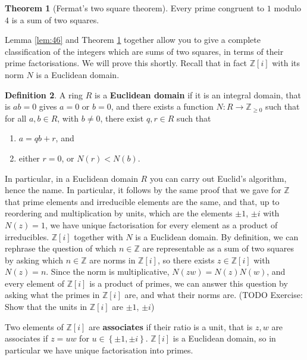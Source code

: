 \documentclass{article}
\newcommand{\Z}{\mathbb{Z}}
\newcommand{\rb}[1]{\left( #1 \right)}
\renewcommand{\sb}[1]{\left[ #1 \right]}
\newcommand{\cb}[1]{\left\{ #1 \right\}}
\theoremstyle{definition}\newtheorem{definition}{Definition}
\theoremstyle{definition}\newtheorem{remark}[definition]{Remark}
\theoremstyle{definition}\newtheorem*{example}{Example}
\theoremstyle{definition}\newtheorem*{note}{Note}
\newtheorem{theorem}[definition]{Theorem}
\begin{document}
\begin{theorem}[Fermat's two square theorem]
\label{thm:47}
Every prime congruent to $ 1 $ modulo $ 4 $ is a sum of two squares.
\end{theorem}

Lemma \ref{lem:46} and Theorem \ref{thm:47} together allow you to give a complete classification of the integers which are sums of two squares, in terms of their prime factorisations. We will prove this shortly. Recall that in fact $ \Z\sb{i} $ with its norm $ N $ is a Euclidean domain.

\begin{definition}
A ring $ R $ is a \textbf{Euclidean domain} if it is an integral domain, that is $ ab = 0 $ gives $ a = 0 $ or $ b = 0 $, and there exists a function $ N : R \to \Z_{\ge 0} $ such that for all $ a, b \in R $, with $ b \ne 0 $, there exist $ q, r \in R $ such that
\begin{enumerate}
\item $ a = qb + r $, and
\item either $ r = 0 $, or $ N\rb{r} < N\rb{b} $.
\end{enumerate}
\end{definition}

In particular, in a Euclidean domain $ R $ you can carry out Euclid's algorithm, hence the name. In particular, it follows by the same proof that we gave for $ \Z $ that prime elements and irreducible elements are the same, and that, up to reordering and multiplication by units, which are the elements $ \pm 1 $, $ \pm i $ with $ N\rb{z} = 1 $, we have unique factorisation for every element as a product of irreducibles. $ \Z\sb{i} $ together with $ N $ is a Euclidean domain. By definition, we can rephrase the question of which $ n \in \Z $ are representable as a sum of two squares by asking which $ n \in \Z $ are norms in $ \Z\sb{i} $, so there exists $ z \in \Z\sb{i} $ with $ N\rb{z} = n $. Since the norm is multiplicative, $ N\rb{zw} = N\rb{z}N\rb{w} $, and every element of $ \Z\sb{i} $ is a product of primes, we can answer this question by asking what the primes in $ \Z\sb{i} $ are, and what their norms are. (TODO Exercise: Show that the units in $ \Z\sb{i} $ are $ \pm 1 $, $ \pm i $)


Two elements of $ \Z\sb{i} $ are \textbf{associates} if their ratio is a unit, that is $ z, w $ are associates if $ z = uw $ for $ u \in \cb{\pm 1, \pm i} $. $ \Z\sb{i} $ is a Euclidean domain, so in particular we have unique factorisation into primes.
\end{document}
